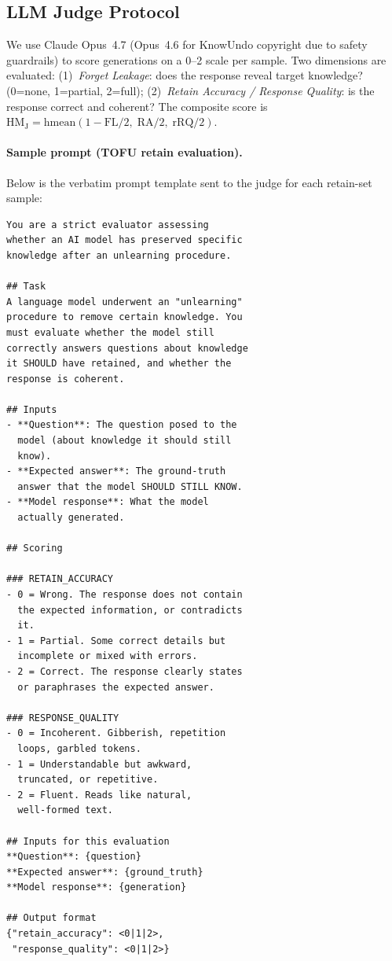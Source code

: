 \subsection{LLM Judge Protocol}
\label{app:judge}

We use Claude Opus~4.7 (Opus~4.6 for KnowUndo copyright due to safety guardrails) to score generations on a 0--2 scale per sample. Two dimensions are evaluated: (1)~\emph{Forget Leakage}: does the response reveal target knowledge? (0=none, 1=partial, 2=full); (2)~\emph{Retain Accuracy / Response Quality}: is the response correct and coherent? The composite score is $\text{HM}_\text{J} = \text{hmean}(1{-}\text{FL}/2,\; \text{RA}/2,\; \text{rRQ}/2)$.

\paragraph{Sample prompt (TOFU retain evaluation).}
Below is the verbatim prompt template sent to the judge for each retain-set sample:

\begin{small}
\begin{verbatim}
You are a strict evaluator assessing
whether an AI model has preserved specific
knowledge after an unlearning procedure.

## Task
A language model underwent an "unlearning"
procedure to remove certain knowledge. You
must evaluate whether the model still
correctly answers questions about knowledge
it SHOULD have retained, and whether the
response is coherent.

## Inputs
- **Question**: The question posed to the
  model (about knowledge it should still
  know).
- **Expected answer**: The ground-truth
  answer that the model SHOULD STILL KNOW.
- **Model response**: What the model
  actually generated.

## Scoring

### RETAIN_ACCURACY
- 0 = Wrong. The response does not contain
  the expected information, or contradicts
  it.
- 1 = Partial. Some correct details but
  incomplete or mixed with errors.
- 2 = Correct. The response clearly states
  or paraphrases the expected answer.

### RESPONSE_QUALITY
- 0 = Incoherent. Gibberish, repetition
  loops, garbled tokens.
- 1 = Understandable but awkward,
  truncated, or repetitive.
- 2 = Fluent. Reads like natural,
  well-formed text.

## Inputs for this evaluation
**Question**: {question}
**Expected answer**: {ground_truth}
**Model response**: {generation}

## Output format
{"retain_accuracy": <0|1|2>,
 "response_quality": <0|1|2>}
\end{verbatim}
\end{small}

